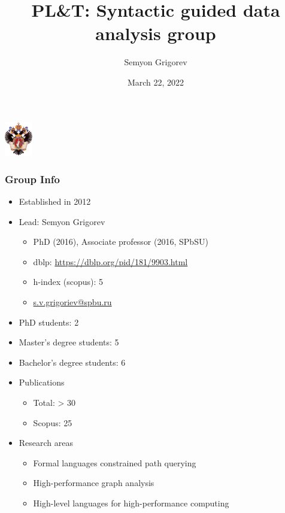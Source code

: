 \documentclass[xcolor=table,aspectratio=169]{beamer}
\title[Syntactic guided data analysis group]{PL\&T: Syntactic guided data analysis group}
\institute[PL\&T@SPbSU]{
Saint Petersburg State University
}
\author[Semyon Grigorev]{Semyon Grigorev}
\date{March 22, 2022}
\begin{document}
{
\begin{frame}[fragile]
  \begin{table}
  \centering
  \includegraphics[height=1.5cm]{pictures/SPbGU_Logo.png}
  \end{table}
  \titlepage
\end{frame}
}



\begin{frame}[fragile]
  \frametitle{Group Info}  
  \begin{itemize}
      \item Established in 2012
      \item Lead: Semyon Grigorev
      \begin{itemize}
        \item PhD (2016), Associate professor (2016, SPbSU)
        \item dblp: \href{https://dblp.org/pid/181/9903.html}{https://dblp.org/pid/181/9903.html}
        \item h-index (scopus): 5
        \item \href{s.v.grigoriev@spbu.ru}{s.v.grigoriev@spbu.ru}
      \end{itemize}
      \item PhD students: 2
      \item Master's degree students: 5
      \item Bachelor's degree students: 6
      \item Publications
      \begin{itemize}
        \item Total: > 30
        \item Scopus: 25 
      \end{itemize}
      \item Research areas
      \begin{itemize}
        \item Formal languages constrained path querying
        \item High-performance graph analysis
        \item High-level languages for high-performance computing
      \end{itemize}
    \end{itemize}
\end{frame}
\end{document}
